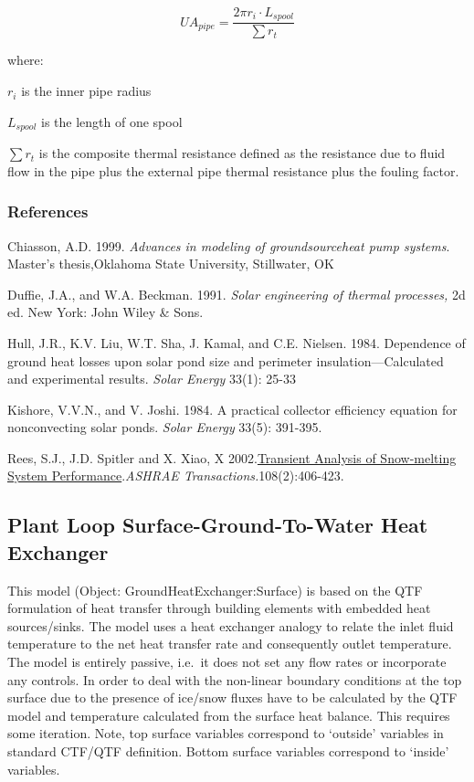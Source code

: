 \begin{equation}
U{A_{pipe}} = \frac{{2\pi {r_i}\cdot {L_{spool}}}}{{\sum {{r_t}} }}
\end{equation}

where:

\({r_i}\) is the inner pipe radius

\({L_{spool}}\)  is the length of one spool

\(\sum {{r_t}}\) is the composite thermal resistance defined as the resistance due to fluid flow in the pipe plus the external pipe thermal resistance plus the fouling factor.

\subsubsection{References}\label{references-4-002}

Chiasson, A.D. 1999. \emph{Advances in modeling of groundsourceheat pump systems}. Master's thesis,Oklahoma State University, Stillwater, OK

Duffie, J.A., and W.A. Beckman. 1991. \emph{Solar engineering of thermal processes,} 2d ed. New York: John Wiley \& Sons.

Hull, J.R., K.V. Liu, W.T. Sha, J. Kamal, and C.E. Nielsen. 1984. Dependence of ground heat losses upon solar pond size and perimeter insulation---Calculated and experimental results. \emph{Solar Energy} 33(1): 25-33

Kishore, V.V.N., and V. Joshi. 1984. A practical collector efficiency equation for nonconvecting solar ponds. \emph{Solar Energy} 33(5): 391-395.

Rees, S.J., J.D. Spitler and X. Xiao, X 2002.\href{http://www.hvac.okstate.edu/pdfs/Rees_Spitler_Xiao_02.pdf}{Transient Analysis of Snow-melting System Performance}.\emph{ASHRAE Transactions.}108(2):406-423.

\subsection{Plant Loop Surface-Ground-To-Water Heat Exchanger}\label{plant-loop-surface-ground-to-water-heat-exchanger}

This model (Object: GroundHeatExchanger:Surface) is based on the QTF formulation of heat transfer through building elements with embedded heat sources/sinks. The model uses a heat exchanger analogy to relate the inlet fluid temperature to the net heat transfer rate and consequently outlet temperature. The model is entirely passive, i.e.~it does not set any flow rates or incorporate any controls. In order to deal with the non-linear boundary conditions at the top surface due to the presence of ice/snow fluxes have to be calculated by the QTF model and temperature calculated from the surface heat balance. This requires some iteration. Note, top surface variables correspond to `outside' variables in standard CTF/QTF definition. Bottom surface variables correspond to `inside' variables.

